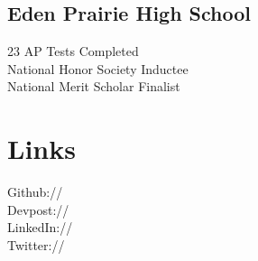 \documentclass[]{deedy-resume-openfont}
\begin{document}
\begin{minipage}[t]{0.33\textwidth}
\subsection{Eden Prairie High School}
23 AP Tests Completed \\
National Honor Society Inductee \\
National Merit Scholar Finalist
\sectionsep


\section{Links} 
Github:// \href{https://github.com/Lathie}{} \\
Devpost:// \href{http://devpost.com/Lathie}{} \\
LinkedIn://  \href{www.linkedin.com/in/victorniu
}{} \\
Twitter://  \href{https://twitter.com/WhatIsYaoi}{} \\
\sectionsep





\end{minipage}
\end{document}
